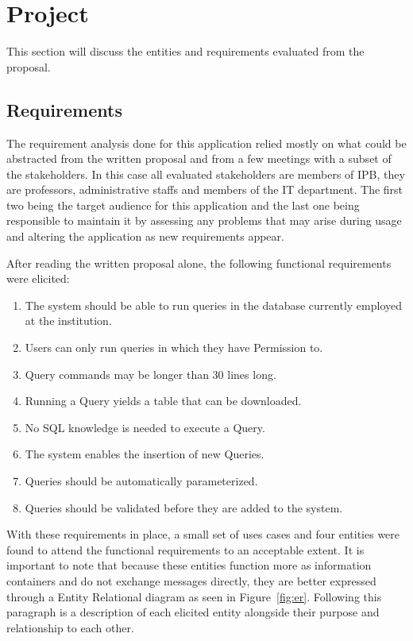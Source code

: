 \chapter{Project}

This section will discuss the entities and requirements evaluated from the proposal.

\section{Requirements}
The requirement analysis done for this application relied mostly on what could be abstracted from the written proposal and from a few meetings with a subset of the stakeholders.
In this case all evaluated stakeholders are members of \gls{IPB}, they are professors, administrative staffs and members of the \gls{IT} department. 
The first two being the target audience for this application and the last one being responsible to maintain it by assessing any problems that may arise during usage and altering the application as new requirements appear.

After reading the written proposal alone, the following functional requirements were elicited:

\begin{enumerate}
\item The system should be able to run queries in the database currently employed at the institution.\label{req:multidb}
\item Users can only run queries in which they have Permission to.\label{req:permission}
\item Query commands may be longer than 30 lines long.\label{req:longquery}
\item Running a Query yields a table that can be downloaded.\label{req:download}
\item No \gls{SQL} knowledge is needed to execute a Query.\label{req:noknowledge}
\item The system enables the insertion of new Queries.\label{req:addquery}
\item Queries should be automatically parameterized.\label{req:no:param}
\item Queries should be validated before they are added to the system.\label{req:no:valid}
\end{enumerate}

With these requirements in place, a small set of uses cases and four entities were found to attend the functional requirements to an acceptable extent.
It is important to note that because these entities function more as information containers and do not exchange messages directly, they are better expressed through a Entity Relational diagram as seen in Figure~\ref{fig:er}.
Following this paragraph is a description of each elicited entity alongside their purpose and relationship to each other.

